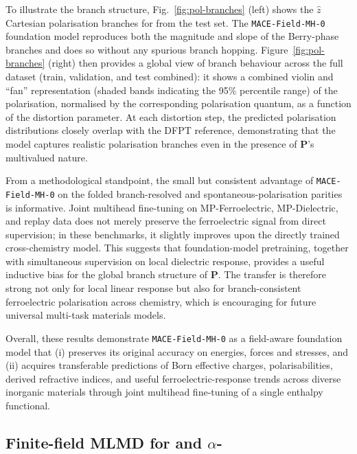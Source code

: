 \documentclass[aps,physrev,graphicx,amsmath,amssymb,
               reprint,superscriptaddress]{revtex4-2}
\begin{document}
To illustrate the branch structure, Fig.~\ref{fig:pol-branches} (left) shows the $\hat{z}$ Cartesian polarisation branches for  from the test set. The \texttt{MACE-Field-MH-0} foundation model reproduces both the magnitude and slope of the Berry-phase branches and does so without any spurious branch hopping. Figure~\ref{fig:pol-branches} (right) then provides a global view of branch behaviour across the full dataset (train, validation, and test combined): it shows a combined violin and ``fan'' representation (shaded bands indicating the 95\% percentile range) of the polarisation, normalised by the corresponding polarisation quantum, as a function of the distortion parameter. At each distortion step, the predicted polarisation distributions closely overlap with the DFPT reference, demonstrating that the model captures realistic polarisation branches even in the presence of $\mathbf{P} $'s multivalued nature.

From a methodological standpoint, the small but consistent advantage of \texttt{MACE-Field-MH-0} on the folded branch-resolved and spontaneous-polarisation parities is informative. Joint multihead fine-tuning on MP-Ferroelectric, MP-Dielectric, and replay data does not merely preserve the ferroelectric signal from direct supervision; in these benchmarks, it slightly improves upon the directly trained cross-chemistry model. This suggests that foundation-model pretraining, together with simultaneous supervision on local dielectric response, provides a useful inductive bias for the global branch structure of $\mathbf P$. The transfer is therefore strong not only for local linear response but also for branch-consistent ferroelectric polarisation across chemistry, which is encouraging for future universal multi-task materials models.

Overall, these results demonstrate \texttt{MACE-Field-MH-0} as a field-aware foundation model that (i) preserves its original accuracy on energies, forces and stresses, and (ii) acquires transferable predictions of Born effective charges, polarisabilities, derived refractive indices, and useful ferroelectric-response trends across diverse inorganic materials through joint multihead fine-tuning of a single enthalpy functional.

\subsection{Finite-field MLMD for  and $\alpha$-}
\label{subsec:finite-field-mlmd}
\end{document}
